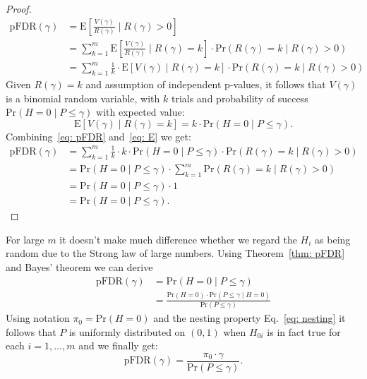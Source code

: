 \documentclass[10pt]{article}
\begin{document}
\begin{proof}
	\begin{align}
	\text{pFDR}(\gamma) 
	&= \text{E} \left[ \frac{V(\gamma)}{R(\gamma)} \mid R(\gamma) > 0 \right] \\
	&= \sum_{k = 1}^{m} \text{E} \left[ \frac{V(\gamma)}{R(\gamma)} \mid R(\gamma) = k \right] \cdot	\text{Pr}(R(\gamma) = k \mid R(\gamma) > 0) \\
	&=  \sum_{k = 1}^{m} \frac{1}{k} \cdot \text{E} \left[ V(\gamma) \mid R(\gamma) = k \right] \cdot	\text{Pr}(R(\gamma) = k \mid R(\gamma) > 0) \label{eq: pFDR}
	\end{align}
	Given $R(\gamma) = k$ and assumption of independent p-values, it follows that $V(\gamma)$ is a binomial random variable, with $k$ trials and probability of success $\text{Pr}(H = 0 \mid P \leq \gamma)$ with expected value:
	\begin{equation} \label{eq: E}
	\text{E} \left[ V(\gamma) \mid R(\gamma) = k \right] = k \cdot \text{Pr}(H = 0 \mid P \leq \gamma).
	\end{equation}
	Combining~\ref{eq: pFDR} and~\ref{eq: E} we get:
	\begin{align}
	\text{pFDR}(\gamma) 
	&= \sum_{k = 1}^{m} \frac{1}{k} \cdot k \cdot \text{Pr}(H = 0 \mid P \leq \gamma) \cdot \text{Pr}(R(\gamma) = k \mid R(\gamma) > 0) \\
	&= \text{Pr}(H = 0 \mid P \leq \gamma) \cdot \sum_{k = 1}^{m} \text{Pr}(R(\gamma) = k \mid R(\gamma) > 0) \\
	&= \text{Pr}(H = 0 \mid P \leq \gamma) \cdot 1 \\
	&= \text{Pr}(H = 0 \mid P \leq \gamma).
	\end{align}
\end{proof}

For large $m$ it doesn't make much difference whether we regard the $H_{i}$ as being random due to the Strong law of large numbers. Using Theorem~\ref{thm: pFDR} and Bayes' theorem we can derive
\begin{align}
\text{pFDR}(\gamma) 
&= \text{Pr}( H = 0 \mid P \leq \gamma) \\
&= \frac{\text{Pr}(H = 0) \cdot \text{Pr}(P \leq \gamma \mid H = 0)}{\text{Pr}(P \leq \gamma)}
\end{align}
Using notation $\pi_{0} = \text{Pr}(H = 0)$ and the nesting property Eq.~\ref{eq: nesting} it follows that $P$ is uniformly distributed on $(0,1)$ when $H_{0i}$ is in fact true for each $i = 1,...,m$ and we finally get:
\begin{equation} \label{eq: estimation}
\text{pFDR}(\gamma) = \frac{\pi_{0} \cdot \gamma}{\text{Pr}(P \leq \gamma)}.
\end{equation}
\end{document}
